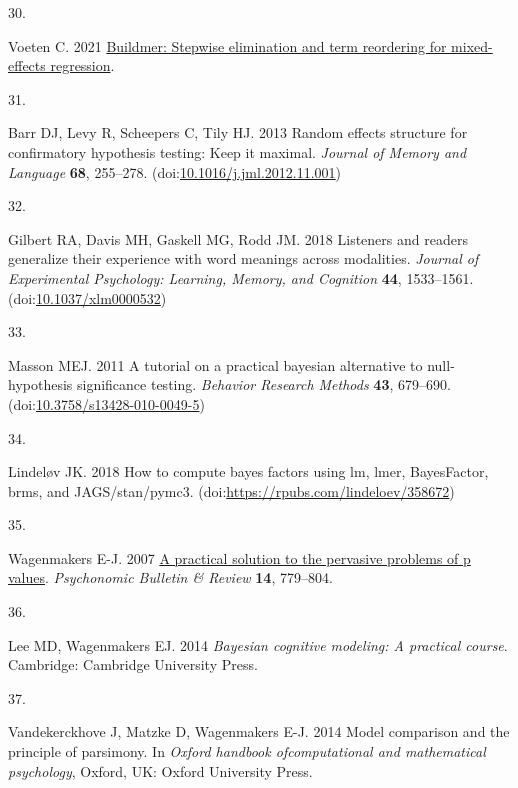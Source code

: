 \documentclass[
]{article}
\newlength{\cslhangindent}
\newlength{\csllabelwidth}
\newlength{\cslentryspacingunit} %
\newenvironment{CSLReferences}[2] %
 {%
  \setlength{\parindent}{0pt}
  \ifodd #1
  \let\oldpar\par
  \def\par{\hangindent=\cslhangindent\oldpar}
  \fi
  \setlength{\parskip}{#2\cslentryspacingunit}
 }%
 {}
\newcommand{\CSLLeftMargin}[1]{\parbox[t]{\csllabelwidth}{#1}}
\newcommand{\CSLRightInline}[1]{\parbox[t]{\linewidth - \csllabelwidth}{#1}\break}
\begin{document}
\begin{CSLReferences}{0}{0}
\leavevmode{}%
\CSLLeftMargin{30. }%
\CSLRightInline{Voeten C. 2021 \href{https://CRAN.R-project.org/package=buildmer}{Buildmer: Stepwise elimination and term reordering for mixed-effects regression}. }

\leavevmode{}%
\CSLLeftMargin{31. }%
\CSLRightInline{Barr DJ, Levy R, Scheepers C, Tily HJ. 2013 Random effects structure for confirmatory hypothesis testing: Keep it maximal. \emph{Journal of Memory and Language} \textbf{68}, 255--278. (doi:\href{https://doi.org/10.1016/j.jml.2012.11.001}{10.1016/j.jml.2012.11.001})}

\leavevmode{}%
\CSLLeftMargin{32. }%
\CSLRightInline{Gilbert RA, Davis MH, Gaskell MG, Rodd JM. 2018 Listeners and readers generalize their experience with word meanings across modalities. \emph{Journal of Experimental Psychology: Learning, Memory, and Cognition} \textbf{44}, 1533--1561. (doi:\href{https://doi.org/10.1037/xlm0000532}{10.1037/xlm0000532})}

\leavevmode{}%
\CSLLeftMargin{33. }%
\CSLRightInline{Masson MEJ. 2011 A tutorial on a practical bayesian alternative to null-hypothesis significance testing. \emph{Behavior Research Methods} \textbf{43}, 679--690. (doi:\href{https://doi.org/10.3758/s13428-010-0049-5}{10.3758/s13428-010-0049-5})}

\leavevmode{}%
\CSLLeftMargin{34. }%
\CSLRightInline{Lindeløv JK. 2018 How to compute bayes factors using lm, lmer, BayesFactor, brms, and JAGS/stan/pymc3. (doi:\url{https://rpubs.com/lindeloev/358672})}

\leavevmode{}%
\CSLLeftMargin{35. }%
\CSLRightInline{Wagenmakers E-J. 2007 \href{http://dx.doi}{A practical solution to the pervasive problems of p values}. \emph{Psychonomic Bulletin \& Review} \textbf{14}, 779--804.}

\leavevmode{}%
\CSLLeftMargin{36. }%
\CSLRightInline{Lee MD, Wagenmakers EJ. 2014 \emph{Bayesian cognitive modeling: A practical course}. Cambridge: Cambridge University Press. }

\leavevmode{}%
\CSLLeftMargin{37. }%
\CSLRightInline{Vandekerckhove J, Matzke D, Wagenmakers E-J. 2014 Model comparison and the principle of parsimony. In \emph{Oxford handbook ofcomputational and mathematical psychology}, Oxford, UK: Oxford University Press. }


\end{CSLReferences}
\end{document}

